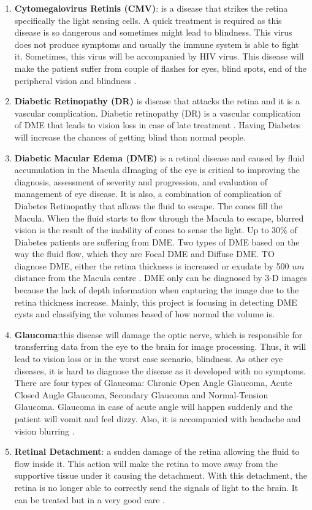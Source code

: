\begin{enumerate}
\item \textbf{Cytomegalovirus Retinis (CMV)}: is a disease that strikes the retina specifically the light sensing cells.
A quick treatment is required as this disease is so dangerous and sometimes might lead to blindness.
This virus does not produce symptoms and usually the immune system is able to fight it.
Sometimes, this virus will be accompanied by HIV virus.
This disease will make the patient suffer from couple of flashes for eyes, blind spots, end of the peripheral vision and blindness \cite{yeager1981prevention}.

\item \textbf{Diabetic Retinopathy (DR)} is disease that attacks the retina and it is a vascular complication.
Diabetic retinopathy (DR) is a vascular complication of DME that leads to vision loss in case of late treatment \cite{wilkinson2003proposed}.
Having Diabetes will increase the chances of getting blind than normal people.
\item \textbf{Diabetic Macular Edema (DME)} is a retinal disease and caused by fluid accumulation in the Macula dImaging of the eye is critical to improving the diagnosis, assessment of severity and progression, and evaluation of management of eye disease. 
It is also, a combination of complication of Diabetes Retinopathy that allows the fluid to escape.
The cones fill the Macula.
When the fluid starts to flow through the Macula to escape, blurred vision is the result of the inability of cones to sense the light.
Up to 30\% of Diabetes patients are suffering from DME.
Two types of DME based on the way the fluid flow, which they are Focal DME and Diffuse DME.
TO diagnose DME, either the retina thickness is increased or exudate by 500 $um$ distance from the Macula centre \cite{bandello2010diabetic}.
DME only can be diagnosed by 3-D images because the lack of depth information when capturing the image due to the retina thickness increase.
Mainly, this project is focusing in detecting DME cysts and classifying the volumes based of how normal the volume is.

\item \textbf{Glaucoma}:this disease will damage the optic nerve, which is responsible for transferring data from the eye to the brain for image processing.
Thus, it will lead to vision loss or in the worst case scenario, blindness.
As other eye diseases, it is hard to diagnose the disease as it developed with no symptoms.
There are four types of Glaucoma: Chronic Open Angle Glaucoma, Acute Closed Angle Glaucoma, Secondary Glaucoma and Normal-Tension Glaucoma.
Glaucoma in case of acute angle will happen suddenly and the patient will vomit and feel dizzy. Also, it is accompanied with headache and vision blurring \cite{group1998comparison}.

\item \textbf{Retinal Detachment}: a sudden damage of the retina allowing the fluid to flow inside it.
This action will make the retina to move away from the supportive tissue under it causing the detachment.
With this detachment, the retina is no longer able to correctly send the signals of light to the brain.
It can be treated but in a very good care \cite{retina1983classification}.
\end{enumerate}

